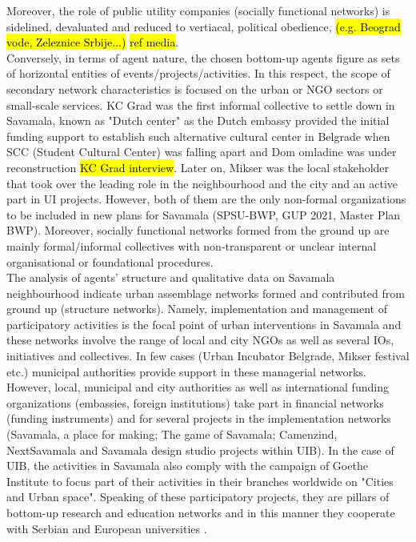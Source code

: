 \documentclass[11pt]{report}
\begin{document}
Moreover, the role of public utility companies (socially functional networks) is sidelined, devaluated and reduced to vertiacal, political obedience, \hl{(e.g. Beograd vode, Zeleznice Srbije...)} \hl{ref media}.
\\
Conversely, in terms of agent nature, the chosen bottom-up agents figure as sets of horizontal entities of events/projects/activities. In this respect, the scope of secondary network characteristics is focused on the urban or NGO sectors or small-scale services.
KC Grad was the first informal collective to settle down in Savamala, known as "Dutch center" as the Dutch embassy provided the initial funding support to establish such alternative cultural center in Belgrade when SCC (Student Cultural Center) was falling apart and Dom omladine was under reconstruction \hl{KC Grad interview}.
Later on, Mikser was the local stakeholder that took over the leading role in the neighbourhood and the city and an active part in UI projects. However, both of them are the only non-formal organizations to be included in new plans for Savamala (SPSU-BWP, GUP 2021, Master Plan BWP).
Moreover, socially functional networks formed from the ground up are mainly formal/informal collectives with non-transparent or unclear internal organisational or foundational procedures.
\\
The analysis of agents’ structure and qualitative data on Savamala neighbourhood indicate urban assemblage networks formed and contributed from ground up (structure networks). Namely, implementation and management of participatory activities is the focal point of urban interventions in Savamala and these networks involve the range of local and city NGOs as well as several IOs, initiatives and collectives. In few cases (Urban Incubator Belgrade, Mikser festival etc.) municipal authorities provide support in these managerial networks. However, local, municipal and city authorities as well as international funding organizations (embassies, foreign institutions) take part in financial networks (funding instruments) and for several projects in the implementation networks (Savamala, a place for making; The game of Savamala; Camenzind, NextSavamala and Savamala design studio projects within UIB).
In the case of UIB, the activities in Savamala also comply with the campaign of Goethe Institute to focus part of their activities in their branches worldwide on "Cities and Urban space". Speaking of these participatory projects, they are pillars of bottom-up research and education networks and in this manner they cooperate with Serbian and European universities .
\end{document}
